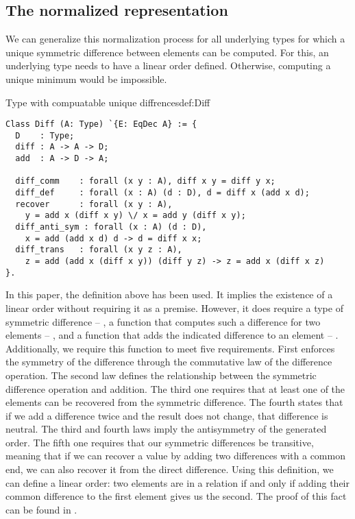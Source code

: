 \subsection{The normalized representation}
We can generalize this normalization process for all underlying types for which a unique symmetric difference between elements can be computed. For this, an underlying type needs to have a linear order defined. Otherwise, computing a unique minimum would be impossible.
\begin{defi}{Type with compuatable unique diffrences}{def:Diff}
\begin{verbatim}
Class Diff (A: Type) `{E: EqDec A} := {
  D    : Type;
  diff : A -> A -> D;
  add  : A -> D -> A;

  diff_comm    : forall (x y : A), diff x y = diff y x;
  diff_def     : forall (x : A) (d : D), d = diff x (add x d);
  recover      : forall (x y : A), 
    y = add x (diff x y) \/ x = add y (diff x y);
  diff_anti_sym : forall (x : A) (d : D), 
    x = add (add x d) d -> d = diff x x;
  diff_trans   : forall (x y z : A), 
    z = add (add x (diff x y)) (diff y z) -> z = add x (diff x z)
}.
\end{verbatim}
\end{defi}
In this paper, the definition above has been used. It implies the existence of a linear order without requiring it as a premise. However, it does require a type of symmetric difference -- , a function that computes such a difference for two elements -- , and a function that adds the indicated difference to an element -- . Additionally, we require this function to meet five requirements. First enforces the symmetry of the difference through the commutative law of the difference operation. The second law defines the relationship between the symmetric difference operation and addition. The third one requires that at least one of the elements can be recovered from the symmetric difference. The fourth states that if we add a difference twice and the result does not change, that difference is neutral. The third and fourth laws imply the antisymmetry of the generated order. The fifth one requires that our symmetric differences be transitive, meaning that if we can recover a value by adding two differences with a common end, we can also recover it from the direct difference. Using this definition, we can define a linear order: two elements are in a relation if and only if adding their common difference to the first element gives us the second. The proof of this fact can be found in .

